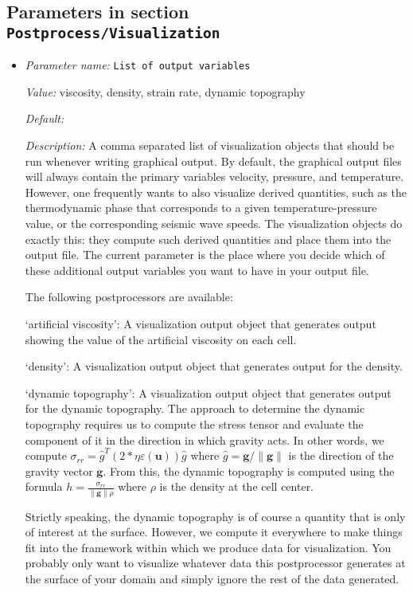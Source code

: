 \subsection{Parameters in section \tt Postprocess/Visualization}
\label{parameters:Postprocess/Visualization}

\begin{itemize}
\item {\it Parameter name:} {\tt List of output variables}


{\it Value:} viscosity, density, strain rate, dynamic topography


{\it Default:} 


{\it Description:} A comma separated list of visualization objects that should be run whenever writing graphical output. By default, the graphical output files will always contain the primary variables velocity, pressure, and temperature. However, one frequently wants to also visualize derived quantities, such as the thermodynamic phase that corresponds to a given temperature-pressure value, or the corresponding seismic wave speeds. The visualization objects do exactly this: they compute such derived quantities and place them into the output file. The current parameter is the place where you decide which of these additional output variables you want to have in your output file.

The following postprocessors are available:

`artificial viscosity': A visualization output object that generates output showing the value of the artificial viscosity on each cell.

`density': A visualization output object that generates output for the density.

`dynamic topography': A visualization output object that generates output for the dynamic topography. The approach to determine the dynamic topography requires us to compute the stress tensor and evaluate the component of it in the direction in which gravity acts. In other words, we compute $\sigma_{rr}={\hat g}^T(2 * \eta \varepsilon(\mathbf u))\hat g$ where $\hat g = \mathbf g/\|\mathbf g\|$ is the direction of the gravity vector $\mathbf g$. From this, the dynamic topography is computed using the formula $h=\frac{\sigma_{rr}}{\|\mathbf g\| \rho}$ where $\rho$ is the density at the cell center.

Strictly speaking, the dynamic topography is of course a quantity that is only of interest at the surface. However, we compute it everywhere to make things fit into the framework within which we produce data for visualization. You probably only want to visualize whatever data this postprocessor generates at the surface of your domain and simply ignore the rest of the data generated.


\end{itemize}
